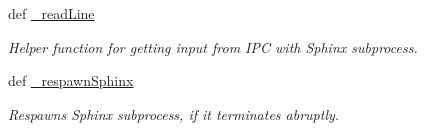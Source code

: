 \begin{DoxyCompactItemize}
def \hyperlink{classrapp__speech__detection__sphinx4_1_1sphinx4__wrapper_1_1Sphinx4Wrapper_ac6ca615b241514eb49192e2bda55750b}{\-\_\-read\-Line}
\begin{DoxyCompactList}\small\item\em Helper function for getting input from I\-P\-C with Sphinx subprocess. \end{DoxyCompactList}\item 
def \hyperlink{classrapp__speech__detection__sphinx4_1_1sphinx4__wrapper_1_1Sphinx4Wrapper_a442019ab62fa3ab63373f24bdcb60d63}{\-\_\-respawn\-Sphinx}
\begin{DoxyCompactList}\small\item\em Respawns Sphinx subprocess, if it terminates abruptly. \end{DoxyCompactList}\end{DoxyCompactItemize}
